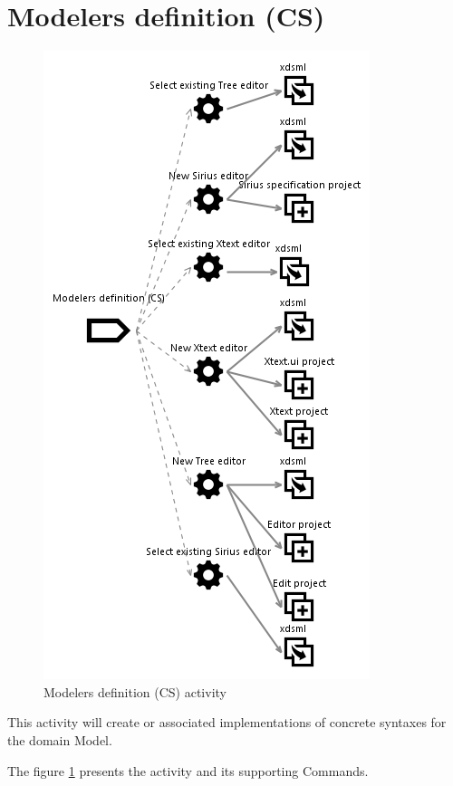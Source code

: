 \documentclass{gemoc} %
\begin{document}
\section{Modelers definition (CS)}
\label{sec:Modelers_definition_(CS)}
\begin{figure}[h]
		\center
		\includegraphics*[trim=0.0cm 0.0cm 0cm 0.0cm, clip=true]{fig/Modelers_definition_(CS)}
		\caption{Modelers definition (CS) activity}
		\label{fig:Modelers_definition_(CS)}
\end{figure}

This activity will create or associated implementations of concrete syntaxes for the domain Model.

The figure \ref{fig:Modelers_definition_(CS)} presents the activity and its supporting Commands.
\end{document}
